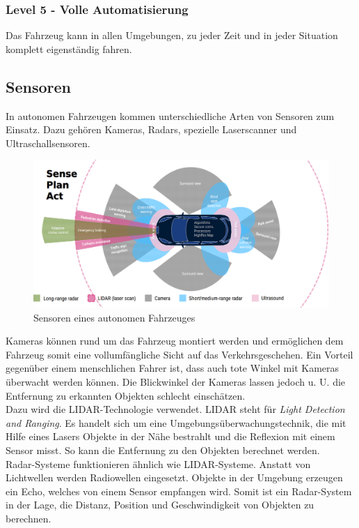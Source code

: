 \subsubsection*{Level 5 - Volle Automatisierung} Das Fahrzeug kann in allen Umgebungen, zu jeder Zeit und in jeder Situation komplett eigenständig fahren.

\subsection{Sensoren}

In autonomen Fahrzeugen kommen unterschiedliche Arten von Sensoren zum Einsatz. 
Dazu gehören Kameras, Radars, spezielle Laserscanner und Ultraschallsensoren.\\

\begin{figure}[H]
    \centering
    \includegraphics[width=.485\textwidth]{resources/images/sensors.png}
    \caption{Sensoren eines autonomen Fahrzeuges \cite{smith2015automated}}
\end{figure}

Kameras können rund um das Fahrzeug montiert werden und ermöglichen dem Fahrzeug somit eine vollumfängliche Sicht auf das Verkehrsgeschehen. Ein Vorteil gegenüber einem menschlichen Fahrer ist, dass auch tote Winkel mit Kameras überwacht werden können. Die Blickwinkel der Kameras lassen jedoch u. U. die Entfernung zu erkannten Objekten schlecht einschätzen.\\

Dazu wird die LIDAR-Technologie \cite{himmelsbach2008lidar} verwendet. LIDAR steht für \textit{Light Detection and Ranging}. Es handelt sich um eine Umgebungsüberwachungstechnik, die mit Hilfe eines Lasers Objekte in der Nähe bestrahlt und die Reflexion mit einem Sensor misst. So kann die Entfernung zu den Objekten berechnet werden.\\

Radar-Systeme \cite{introductionToRadarSystems} funktionieren ähnlich wie LIDAR-Systeme. Anstatt von Lichtwellen werden Radiowellen eingesetzt. Objekte in der Umgebung erzeugen ein Echo, welches von einem Sensor empfangen wird. Somit ist ein Radar-System in der Lage, die Distanz, Position und Geschwindigkeit von Objekten zu berechnen.\\

